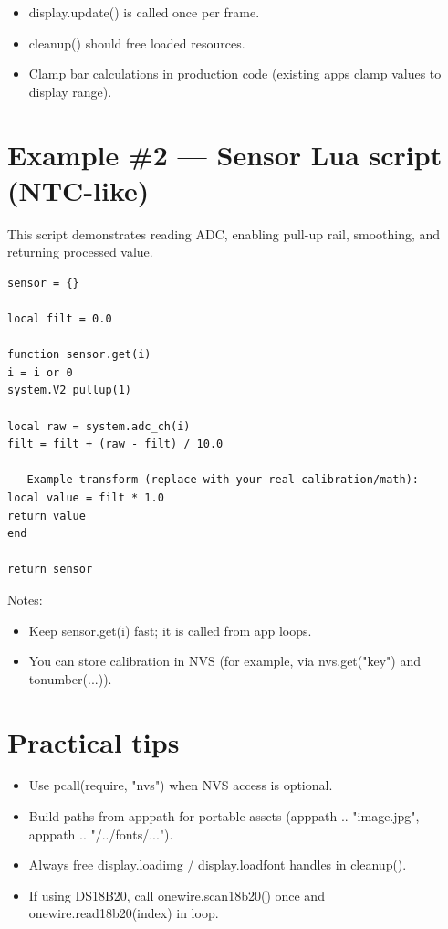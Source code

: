 \begin{itemize}
\item display.update() is called once per frame.
\item cleanup() should free loaded resources.
\item Clamp bar calculations in production code (existing apps clamp values to display range).
\end{itemize}
\section{Example \#2 — Sensor Lua script (NTC-like)}
This script demonstrates reading ADC, enabling pull-up rail, smoothing, and returning processed value.

\begin{verbatim}
sensor = {}

local filt = 0.0

function sensor.get(i)
i = i or 0
system.V2_pullup(1)

local raw = system.adc_ch(i)
filt = filt + (raw - filt) / 10.0

-- Example transform (replace with your real calibration/math):
local value = filt * 1.0
return value
end

return sensor
\end{verbatim}
Notes:

\begin{itemize}
\item Keep sensor.get(i) fast; it is called from app loops.
\item You can store calibration in NVS (for example, via nvs.get("key") and tonumber(...)).
\end{itemize}
\section{Practical tips}
\begin{itemize}
\item Use pcall(require, "nvs") when NVS access is optional.
\item Build paths from apppath for portable assets (apppath .. "image.jpg", apppath .. "/../fonts/...").
\item Always free display.loadimg / display.loadfont handles in cleanup().
\item If using DS18B20, call onewire.scan18b20() once and onewire.read18b20(index) in loop.
\end{itemize}
